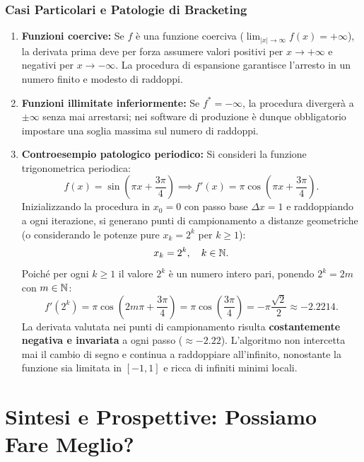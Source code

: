 \subsubsection{Casi Particolari e Patologie di Bracketing}
\begin{enumerate}
    \item \textbf{Funzioni coercive:} Se $f$ \`e una funzione coerciva ($\lim_{|x| \to \infty} f(x) = +\infty$), la derivata prima deve per forza assumere valori positivi per $x \to +\infty$ e negativi per $x \to -\infty$. La procedura di espansione garantisce l'arresto in un numero finito e modesto di raddoppi.
    \item \textbf{Funzioni illimitate inferiormente:} Se $f^* = -\infty$, la procedura diverger\`a a $\pm\infty$ senza mai arrestarsi; nei software di produzione \`e dunque obbligatorio impostare una soglia massima sul numero di raddoppi.
    \item \textbf{Controesempio patologico periodico:}
    Si consideri la funzione trigonometrica periodica:
    \begin{equation}
        f(x) = \sin\left(\pi x + \frac{3\pi}{4}\right) \implies f'(x) = \pi \cos\left(\pi x + \frac{3\pi}{4}\right).
    \end{equation}
    Inizializzando la procedura in $x_0 = 0$ con passo base $\Delta x = 1$ e raddoppiando a ogni iterazione, si generano punti di campionamento a distanze geometriche (o considerando le potenze pure $x_k = 2^k$ per $k \ge 1$):
    \begin{equation}
        x_k = 2^k, \quad k \in \mathbb{N}.
    \end{equation}
    Poich\'e per ogni $k \ge 1$ il valore $2^k$ \`e un numero intero pari, ponendo $2^k = 2m$ con $m \in \mathbb{N}$:
    \begin{equation}
        f'(2^k) = \pi \cos\left(2m \pi + \frac{3\pi}{4}\right) = \pi \cos\left(\frac{3\pi}{4}\right) = -\pi \frac{\sqrt{2}}{2} \approx -2.2214.
    \end{equation}
    La derivata valutata nei punti di campionamento risulta \textbf{costantemente negativa e invariata} a ogni passo ($\approx -2.22$). L'algoritmo non intercetta mai il cambio di segno e continua a raddoppiare all'infinito, nonostante la funzione sia limitata in $[-1, 1]$ e ricca di infiniti minimi locali.
\end{enumerate}

\FloatBarrier
\section{Sintesi e Prospettive: Possiamo Fare Meglio?}
\label{sec:univariata-chiusura-prospettive}

